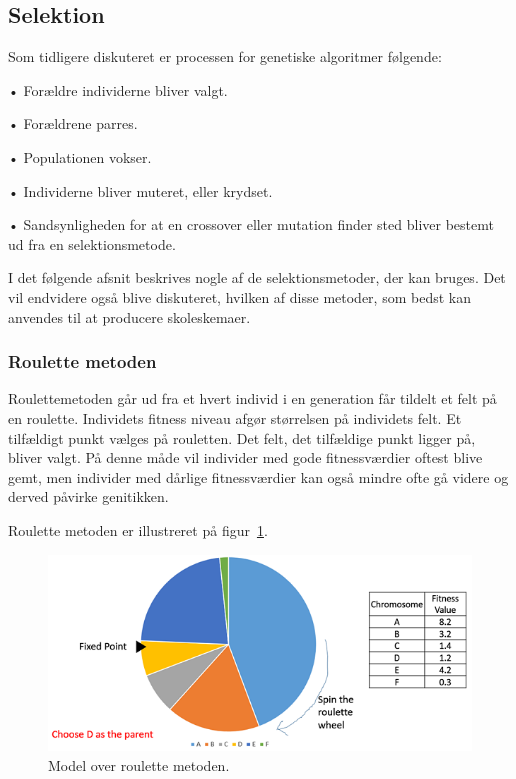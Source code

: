 \subsection{Selektion}
Som tidligere diskuteret er processen for genetiske algoritmer følgende:

•	Forældre individerne bliver valgt.


•	Forældrene parres.


•	Populationen vokser.


•	Individerne bliver muteret, eller krydset.


•	Sandsynligheden for at en crossover eller mutation finder sted bliver bestemt ud fra en selektionsmetode.


I det følgende afsnit beskrives nogle af de selektionsmetoder, der kan bruges. Det vil endvidere også blive diskuteret, hvilken af disse metoder, som bedst kan anvendes til at producere skoleskemaer.

\subsubsection{Roulette metoden}
Roulettemetoden går ud fra et hvert individ i en generation får tildelt et felt på en roulette. Individets fitness niveau afgør størrelsen på individets felt. Et tilfældigt punkt vælges på rouletten. Det felt, det tilfældige punkt ligger på, bliver valgt. På denne måde vil individer med gode fitnessværdier oftest blive gemt, men individer med dårlige fitnessværdier kan også mindre ofte gå videre og derved påvirke genitikken. 

Roulette metoden er illustreret på figur~\ref{fig:roulette}.
\begin{figure}[!h]
  \centering
  \includegraphics[width=\textwidth]{partials/graphics/roulette.png}
  \caption{Model over roulette metoden.}
  \label{fig:roulette}
\end{figure}

